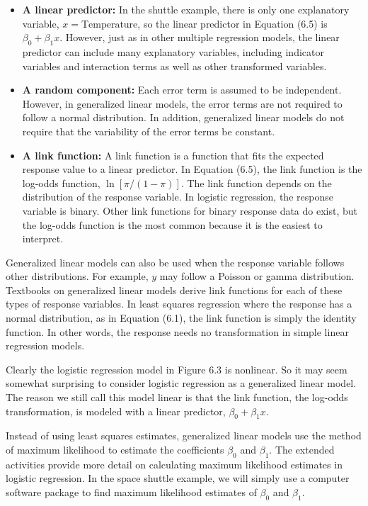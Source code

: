 \documentclass[
]{report}
\begin{document}
\begin{itemize}
  \item \textbf{A linear predictor:} In the shuttle example, there is only one explanatory variable, $x = \text{Temperature}$, so the linear predictor in Equation (6.5) is $\beta_0 + \beta_1 x$. However, just as in other multiple regression models, the linear predictor can include many explanatory variables, including indicator variables and interaction terms as well as other transformed variables.
  \item \textbf{A random component:} Each error term is assumed to be independent. However, in generalized linear models, the error terms are not required to follow a normal distribution. In addition, generalized linear models do not require that the variability of the error terms be constant.
  \item \textbf{A link function:} A link function is a function that fits the expected response value to a linear predictor. In Equation (6.5), the link function is the log-odds function, $\ln[\pi/(1 - \pi)]$. The link function depends on the distribution of the response variable. In logistic regression, the response variable is binary. Other link functions for binary response data do exist, but the log-odds function is the most common because it is the easiest to interpret.
\end{itemize}

Generalized linear models can also be used when the response variable follows other distributions. For example, \(y\) may follow a Poisson or gamma distribution. Textbooks on generalized linear models derive link functions for each of these types of response variables. In least squares regression where the response has a normal distribution, as in Equation (6.1), the link function is simply the identity function. In other words, the response needs no transformation in simple linear regression models.

Clearly the logistic regression model in Figure 6.3 is nonlinear. So it may seem somewhat surprising to consider logistic regression as a generalized linear model. The reason we still call this model linear is that the link function, the log-odds transformation, is modeled with a linear predictor, \(\beta_0 + \beta_1 x\).

Instead of using least squares estimates, generalized linear models use the method of maximum likelihood to estimate the coefficients \(\beta_0\) and \(\beta_1\). The extended activities provide more detail on calculating maximum likelihood estimates in logistic regression. In the space shuttle example, we will simply use a computer software package to find maximum likelihood estimates of \(\beta_0\) and \(\beta_1\).
\end{document}
